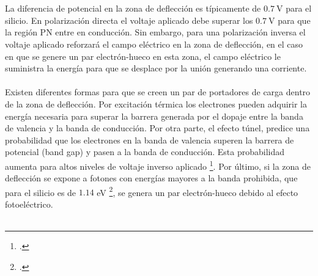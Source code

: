 \\ \\ 
La diferencia de potencial en la zona de deflección es típicamente de $0.7~$V para el silicio. En polarización directa el voltaje aplicado debe superar los  $0.7~$V para que la región PN entre en conducción. Sin embargo, para una polarización inversa el voltaje aplicado reforzará el campo eléctrico en la zona de deflección, en el caso en que se genere un par electrón-hueco en esta zona, el campo eléctrico le suministra la energía para que se desplace por la unión generando una corriente.\\ \\%
Existen diferentes formas para que se creen un par de portadores de carga dentro de  la zona de deflección. Por excitación térmica los electrones pueden adquirir la energía necesaria para superar la barrera generada por el dopaje entre la banda de valencia y la banda de conducción. Por otra parte, el efecto túnel, predice una probabilidad que los electrones en la banda de valencia superen la barrera de potencial (band gap) y pasen a la banda de conducción. Esta probabilidad aumenta para altos niveles de voltaje inverso aplicado \footcite{tesis_caract_SIPM}. Por último, si la zona de deflección se expone a fotones con energías mayores a la banda prohibida, que para el silicio es de $1.14$ eV \footcite{MPPC_note}, se genera un par electrón-hueco debido al efecto fotoeléctrico.\\ \\

